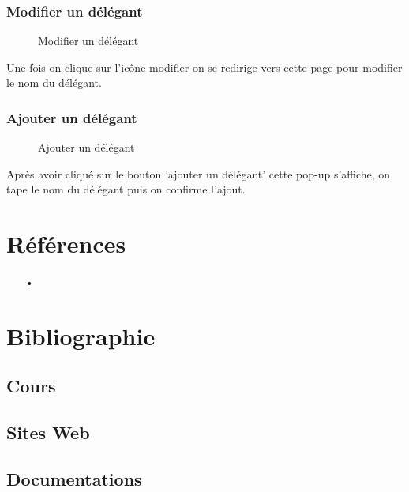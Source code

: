 \documentclass[a4paper]{report}
\begin{document}
\subsection{Modifier un délégant}
\begin{figure}[H]
	\begin{center}
		\caption{Modifier un délégant}
	\end{center}
\end{figure}
Une fois on clique sur l'icône modifier on se redirige vers cette page pour modifier le nom du délégant.
\subsection{Ajouter un délégant}
\begin{figure}[H]
	\begin{center}
		\caption{Ajouter un délégant}
	\end{center}
\end{figure}
Après avoir cliqué sur le bouton 'ajouter un délégant' cette pop-up s'affiche, on tape le nom du délégant puis on confirme l'ajout.
\newpage


\appendix
{} \setcounter{page}{1}
\chapter{Références}

\begin{itemize}
	\item[•] %
\end{itemize}

\chapter{Bibliographie}

\section{Cours}
\section{Sites Web}
\section{Documentations}
\end{document}
